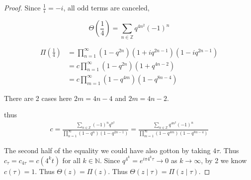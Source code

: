 \documentclass{article}
\newcommand{\Z}{\mathbb{Z}}
\newcommand{\N}{\mathbb{N}}
\begin{document}
\begin{proof}
    Since $\frac{1}{i} = -i$, all odd terms are canceled,

    \begin{equation*}
        \Theta\left(\frac{1}{4}\right) =\sum_{n \in \Z} q^{4n^2} (-1)^n 
    \end{equation*}
    
    \begin{align*}
        \Pi(\frac{1}{4}) &= \prod_{n = 1}^{\infty}(1 - q^{2n})(1 + iq^{2n - 1})(1 - iq^{2 n - 1})\\
        &=  c\prod_{n = 1}^{\infty}(1 - q^{2n})(1 + q^{4 n - 2}) \\
        &=c\prod_{m = 1}^{\infty}(1 - q^{4m})(1 - q^{8 n - 4})
    \end{align*}

    There are 2 cases here $2m = 4n - 4$ and $2m = 4n - 2$. 
    
    thus
    \begin{align*}
        c = \frac{\sum_{n \in \Z} (-1)^n q^{n^2}}{\prod_{n = 1}^{\infty}(1 - q^n)(1 - q^{2 n - 1})} = \frac{\sum_{n \in \Z} q^{4n^2} (-1)^n }{\prod_{m = 1}^{\infty}(1 - q^{4m})(1 - q^{8 n - 4})}
    \end{align*}

    The second half of the equality we could have also gotton by taking $4\tau$. Thus $c_\tau = c_{4 \tau} = c(4^k t)$ for all $k \in \N$. Since $q^{4^k} = e^{i \pi 4^k \tau} \to 0$ as $k \to \infty$,  by 2 we know $c(\tau) = 1$. Thus $\Theta(z) = \Pi(z)$. Thus $\Theta(z \mid \tau) = \Pi(z \mid \tau)$.      

\end{proof}
\end{document}
